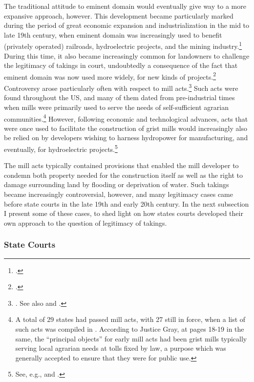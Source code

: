 The traditional attitude to eminent domain would eventually give way to a more expansive approach, however. This development became particularly marked during the period of great economic expansion and industrialization in the mid to late 19th century, when eminent domain was increasingly used to benefit (privately operated) railroads, hydroelectric projects, and the mining industry.\footcite[23-33]{meidinger80} During this time, it also became increasingly common for landowners to challenge the legitimacy of takings in court, undoubtedly a consequence of the fact that eminent domain was now used more widely, for new kinds of projects.\footcite[24]{meidinger80} Controversy arose particularly often with respect to mill acts.\footnote{\cite[24]{meidinger80}. See also \cite[306-313]{johnson11} and \cite[251-252]{horwitz73}.} Such acts were found throughout the US, and many of them dated from pre-industrial times when mills were primarily used to serve the needs of self-sufficient agrarian communities.\footnote{A total of 29 states had passed mill acts, with 27 still in force, when a list of such acts was compiled in \cite[17]{head85}. According to Justice Gray, at pages 18-19 in the same, the ``principal objects'' for early mill acts had been grist mills typically serving local agrarian needs at tolls fixed by law, a purpose which was generally accepted to ensure that they were for public use.}  However, following economic and technological advances, acts that were once used to facilitate the construction of grist mills would increasingly also be relied on by developers wishing to harness hydropower for manufacturing, and eventually, for hydroelectric projects.\footnote{See, e.g., \cite[18-21]{head85} and \cite[449-452]{minn06}.}

The mill acts typically contained provisions that enabled the mill developer to condemn both property needed for the construction itself as well as the right to damage surrounding land by flooding or deprivation of water. Such takings became increasingly controversial, however, and many legitimacy cases came before state courts in the late 19th and early 20th century. In the next subsection I present some of these cases, to shed light on how states courts developed their own approach to the question of legitimacy of takings.

\subsubsection{State Courts}\label{subsec:state}

